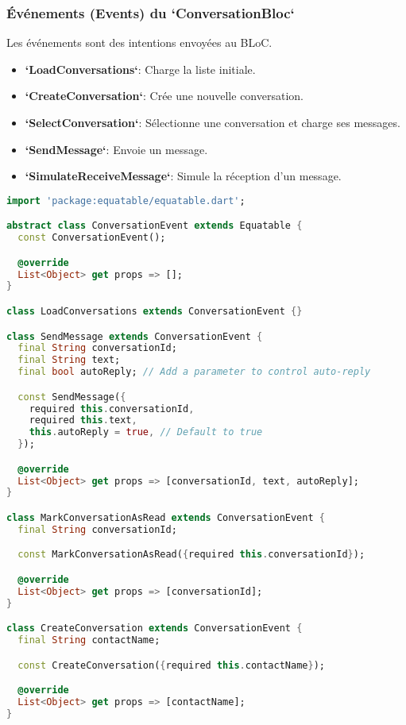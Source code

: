 \documentclass[12pt,a4paper]{article}
\begin{document}
\subsubsection{Événements (Events) du `ConversationBloc`}
Les événements sont des intentions envoyées au BLoC.
\begin{itemize}
    \item \textbf{`LoadConversations`}: Charge la liste initiale.
    \item \textbf{`CreateConversation`}: Crée une nouvelle conversation.
    \item \textbf{`SelectConversation`}: Sélectionne une conversation et charge ses messages.
    \item \textbf{`SendMessage`}: Envoie un message.
    \item \textbf{`SimulateReceiveMessage`}: Simule la réception d'un message.
\end{itemize}

\begin{lstlisting}[language=Dart, caption=Définition des événements du ConversationBloc (`conversation_event.dart`), style=dartstyle]
import 'package:equatable/equatable.dart';

abstract class ConversationEvent extends Equatable {
  const ConversationEvent();

  @override
  List<Object> get props => [];
}

class LoadConversations extends ConversationEvent {}

class SendMessage extends ConversationEvent {
  final String conversationId;
  final String text;
  final bool autoReply; // Add a parameter to control auto-reply

  const SendMessage({
    required this.conversationId,
    required this.text,
    this.autoReply = true, // Default to true
  });

  @override
  List<Object> get props => [conversationId, text, autoReply];
}

class MarkConversationAsRead extends ConversationEvent {
  final String conversationId;

  const MarkConversationAsRead({required this.conversationId});

  @override
  List<Object> get props => [conversationId];
}

class CreateConversation extends ConversationEvent {
  final String contactName;

  const CreateConversation({required this.contactName});

  @override
  List<Object> get props => [contactName];
}
\end{lstlisting}
\end{document}
